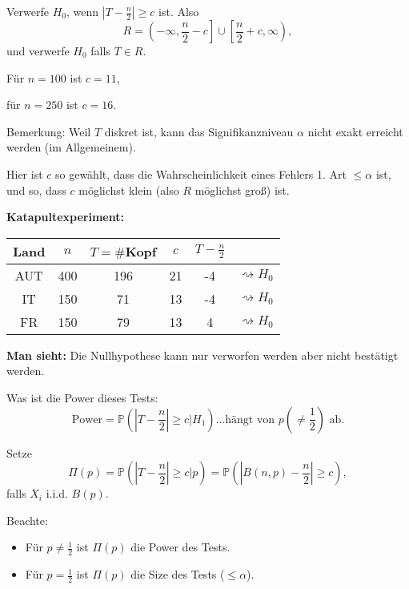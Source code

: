 \documentclass{tstextbook}
\newcommand{\Prob}{\mathbb P}
\begin{document}
\begin{example}
	Verwerfe $ H_0 $, wenn $ |T-\frac{n}{2}| \ge c $ ist. Also 
	\[
	R = \left(-\infty,\frac{n}{2}-c\right]\cup\left[\frac{n}{2}+c,\infty\right),
	\]
	und verwerfe $ H_0 $ falls $ T\in R $.
	
	Für $ n=100 $ ist $ c=11 $, 
	
	für $ n=250 $ ist $ c=16 $. 
	
	Bemerkung: Weil $ T $ diskret ist, kann das Signifikanzniveau $ \alpha $ nicht exakt erreicht werden (im Allgemeinem). 
	
	Hier ist $ c $ so gewählt, dass die Wahrscheinlichkeit eines Fehlers 1. Art $ \le\alpha $ ist, und so, dass $ c $ möglichst klein (also $ R $ möglichst groß) ist.
	
	\textbf{Katapultexperiment:}
		\vspace{0.5cm}

\begin{center}
	\begin{tabular}{c|c|c|c|c|c}
		Land 	& $ n $ 	& $ T=\# $Kopf 	& $ c $ 	& $ T-\frac{n}{2} $ 	& \\
		\midrule
		AUT		& 400		& 196 			& 21		& -4					& $ \rightsquigarrow H_0 $ \\
		IT		& 150		& 71 			& 13		& -4					& $ \rightsquigarrow H_0 $ \\
		FR		& 150		& 79 			& 13		& 4					& $ \rightsquigarrow H_0 $ \\
	\end{tabular}
\end{center}
	\vspace{0.5cm}
	
	\textbf{Man sieht:} Die Nullhypothese kann nur verworfen werden aber nicht bestätigt werden.
	
	Was ist die Power dieses Tests:
	\[
	\text{Power}=\Prob\left(|T-\frac{n}{2}|\ge c|H_1\right)\ldots \text{hängt von }p\left(\ne\frac{1}{2}\right) \text{ ab.}
	\]
	
	Setze
	\[
	\Pi(p)=\Prob\left(|T-\frac{n}{2}|\ge c|p\right) = \Prob\left(|B(n,p)-\frac{n}{2}|\ge c\right),
	\]
	falls $ X_i $ i.i.d. $ B(p) $.
	
	Beachte: 
	\begin{itemize}
		\item Für $ p\ne\frac{1}{2} $ ist $ \Pi(p) $ die Power des Tests.
		\item Für $ p=\frac{1}{2} $ ist $ \Pi(p) $ die Size des Tests ($ \le\alpha $).
	\end{itemize}
	
\end{example}
\end{document}
